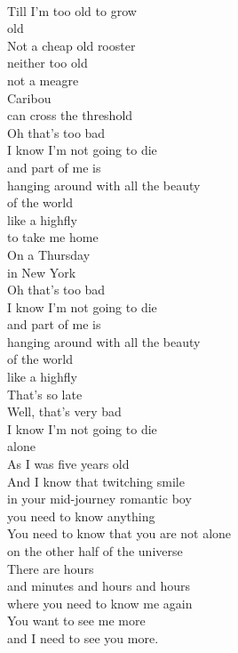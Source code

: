 \documentclass[smalldemyvopaper,11pt,twoside,onecolumn,openright,extrafontsizes]{memoir}
\begin{document}
\\Till I'm too old to grow
\\old
\\Not a cheap old rooster
\\neither too old
\\not a meagre
\\Caribou
\\can cross the threshold
\\Oh that's too bad
\\I know I'm not going to die
\\and part of me is
\\hanging around with all the beauty
\\of the world
\\like a highfly
\\to take me home
\\On a Thursday
\\in New York
\\Oh that's too bad
\\I know I'm not going to die
\\and part of me is
\\hanging around with all the beauty
\\of the world
\\like a highfly
\\That's so late
\\Well, that's very bad
\\I know I'm not going to die
\\alone
\\As I was five years old
\\And I know that twitching smile
\\in your mid-journey romantic boy
\\you need to know anything
\\You need to know that you are not alone
\\on the other half of the universe
\\There are hours
\\and minutes and hours and hours
\\where you need to know me again
\\You want to see me more
\\and I need to see you more.
\end{document}
